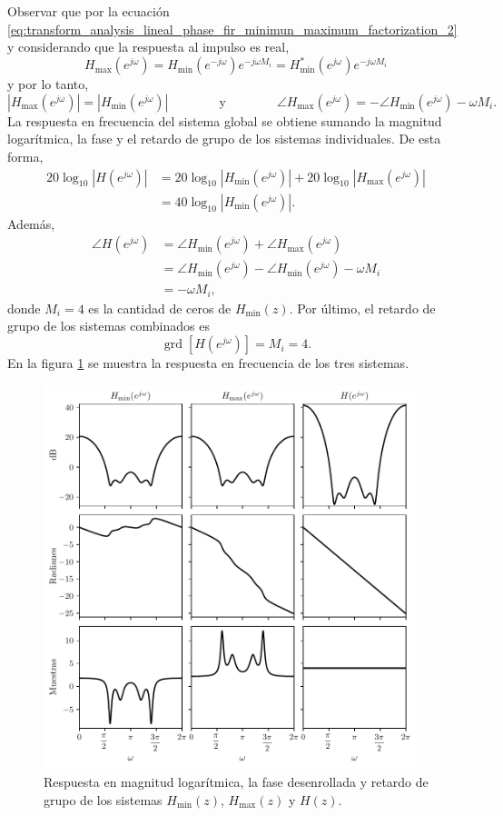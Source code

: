 \documentclass[a4paper]{report}
\DeclareMathOperator{\grd}{grd}
\begin{document}
Observar que por la ecuación \ref{eq:transform_analysis_lineal_phase_fir_minimun_maximum_factorization_2} y considerando que la respuesta al impulso es real,
\[
 H_\textrm{max}(e^{j\omega})=H_\textrm{min}(e^{-j\omega})e^{-j\omega M_i}=H^*_\textrm{min}(e^{j\omega})e^{-j\omega M_i}
\]
y por lo tanto,
\[
 |H_\textrm{max}(e^{j\omega})|=|H_\textrm{min}(e^{j\omega})|
 \qquad\qquad\textrm{y}\qquad\qquad
 \angle H_\textrm{max}(e^{j\omega})=-\angle H_\textrm{min}(e^{j\omega})-\omega M_i.
\]
La respuesta en frecuencia del sistema global se obtiene sumando la magnitud logarítmica, la fase y el retardo de grupo de los sistemas individuales. De esta forma,
\begin{align*}
 20\log_{10}|H(e^{j\omega})|&=20\log_{10}|H_\textrm{min}(e^{j\omega})|+20\log_{10}|H_\textrm{max}(e^{j\omega})|\\
   &=40\log_{10}|H_\textrm{min}(e^{j\omega})|.
\end{align*}
Además,
\begin{align*}
 \angle H(e^{j\omega})&=\angle H_\textrm{min}(e^{j\omega})+\angle H_\textrm{max}(e^{j\omega})\\
   &=\angle H_\textrm{min}(e^{j\omega})-\angle H_\textrm{min}(e^{j\omega})-\omega M_i\\
   &=-\omega M_i,
\end{align*}
donde \(M_i=4\) es la cantidad de ceros de \(H_\textrm{min}(z)\). Por último, el retardo de grupo de los sistemas combinados es
\[
 \grd[H(e^{j\omega})]=M_i=4.
\]
En la figura \ref{fig:example_05_19_freq_responses} se muestra la respuesta en frecuencia de los tres sistemas.
\begin{figure}[!htb]
 \begin{center}
 \includegraphics[width=0.97\textwidth]{figuras/example_05_19_freq_responses.pdf}
 \caption{\label{fig:example_05_19_freq_responses} Respuesta en magnitud logarítmica, la fase desenrollada y retardo de grupo de los sistemas \(H_\textrm{min}(z)\), \(H_\textrm{max}(z)\) y \(H(z)\).}
 \end{center}
\end{figure}
\end{document}

